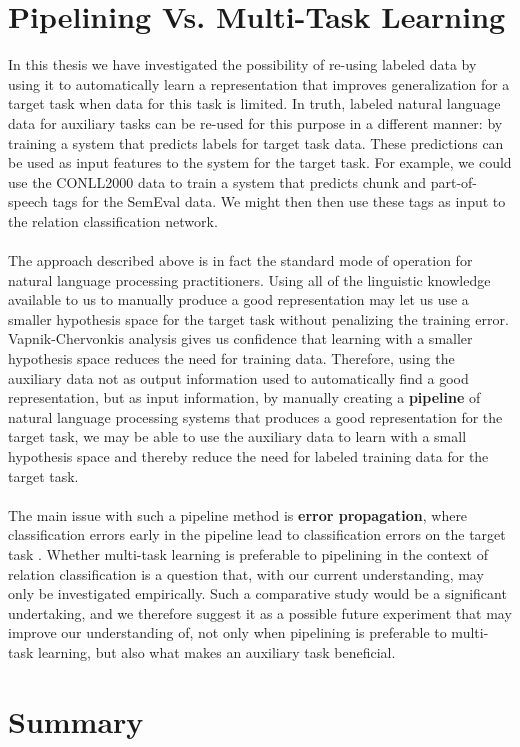 \section{Pipelining Vs. Multi-Task Learning}
In this thesis we have investigated the possibility of re-using labeled data by using it to automatically learn a representation that improves generalization for a target task when data for this task is limited. In truth, labeled natural language data for auxiliary tasks can be re-used for this purpose in a different manner: by training a system that predicts labels for target task data. These predictions can be used as input features to the system for the target task. For example, we could use the CONLL2000 data to train a system that predicts chunk and part-of-speech tags for the SemEval data. We might then then use these tags as input to the relation classification network.
\\\\
The approach described above is in fact the standard mode of operation for natural language processing practitioners. Using all of the linguistic knowledge available to us to manually produce a good representation may let us use a smaller hypothesis space for the target task without penalizing the training error. Vapnik-Chervonkis analysis gives us confidence that learning with a smaller hypothesis space reduces the need for training data. Therefore, using the auxiliary data not as output information used to automatically find a good representation, but as input information, by manually creating a \textbf{pipeline} of natural language processing systems that produces a good representation for the target task, we may be able to use the auxiliary data to learn with a small hypothesis space and thereby reduce the need for labeled training data for the target task.
\\\\
The main issue with such a pipeline method is \textbf{error propagation}, where classification errors early in the pipeline lead to classification errors on the target task \citep{collobert2011}. Whether multi-task learning is preferable to pipelining in the context of relation classification is a question that, with our current understanding, may only be investigated empirically. Such a comparative study would be a significant undertaking, and we therefore suggest it as a possible future experiment that may improve our understanding of, not only when pipelining is preferable to multi-task learning, but also what makes an auxiliary task beneficial.

\section{Summary}